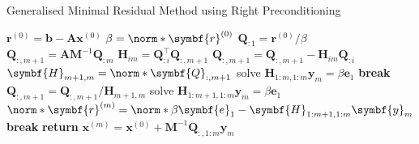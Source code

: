 \documentclass{article}
\begin{document}
\begin{algorithm}[H]
    \caption{Generalised Minimal Residual Method using Right Preconditioning}
    \begin{algorithmic}
        \State \(\symbf{r}^{\left( 0 \right)} = \symbf{b} - \symbf{A} \symbf{x}^{\left( 0 \right)}\)
        \State \(\beta = \norm*{\symbf{r}^{\left( 0 \right)}}\)
        \State \(\symbf{Q}_{:1} = \symbf{r}^{\left( 0 \right)}/\beta\)
        \State \(\symbf{Q}_{:,m+1} = \symbf{A} \symbf{M}^{-1} \symbf{Q}_{:m}\) 
        \State \(\symbf{H}_{im} = \symbf{Q}_{:i}^\top \symbf{Q}_{:,m + 1}\)
        \State \(\symbf{Q}_{:,m+1} = \symbf{Q}_{:,m+1} - \symbf{H}_{im} \symbf{Q}_{:i}\)
        \EndFor
        \State \(\symbf{H}_{m+1,m} = \norm*{\symbf{Q}_{:,m+1}}\)
        \Statex
        \State solve \(\symbf{H}_{1:m,1:m} \symbf{y}_m = \beta \symbf{e}_1\)
        \State \textbf{break}
        \EndIf
        \State \(\symbf{Q}_{:,m+1} = \symbf{Q}_{:,m+1} / \symbf{H}_{m+1,m}\)
        \Statex
        \State solve \(\symbf{H}_{1:m+1,1:m} \symbf{y}_m = \beta \symbf{e}_1\)
        \State \(\norm*{\symbf{r}^{\left( m \right)}} = \norm*{\beta \symbf{e}_1 - \symbf{H}_{1:m+1,1:m} \symbf{y}_m}\)
        \State \textbf{break}
        \EndIf
        \EndFor
        \State \textbf{return} \(\symbf{x}^{\left( m \right)} = \symbf{x}^{\left( 0 \right)} + \symbf{M}^{-1} \symbf{Q}_{:,1:m} \symbf{y}_m\) 
    \end{algorithmic}
\end{algorithm}
\end{document}
